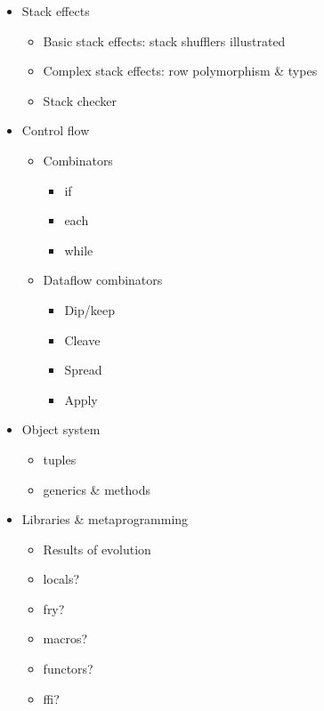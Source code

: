 \documentclass[11pt]{article}
\begin{document}
\begin{itemize}
\item Stack effects
      \begin{itemize}
        \item Basic stack effects: stack shufflers illustrated
        \item Complex stack effects: row polymorphism \& types
        \item Stack checker
      \end{itemize}

\item Control flow
      \begin{itemize}
        \item Combinators
              \begin{itemize}
                \item if
                \item each
                \item while
              \end{itemize}
        \item Dataflow combinators
              \begin{itemize}
                \item Dip/keep
                \item Cleave
                \item Spread
                \item Apply
              \end{itemize}
      \end{itemize}

\item Object system
      \begin{itemize}
        \item tuples
        \item generics \& methods
      \end{itemize}

\item Libraries \& metaprogramming
      \begin{itemize}
        \item Results of evolution
        \item locals?
        \item fry?
        \item macros?
        \item functors?
        \item ffi?
      \end{itemize}

\end{itemize}
\end{document}
